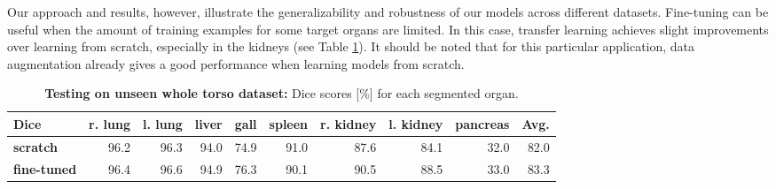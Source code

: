 \documentclass[authoryear]{elsarticle}
\begin{document}
Our approach and results, however, illustrate the generalizability and robustness of our models across different datasets. Fine-tuning can be useful when the amount of training examples for some target organs are limited. In this case, transfer learning achieves slight improvements over learning from scratch, especially in the kidneys (see Table \ref{tab:fine-tuning_dice_results_testing}). It should be noted that for this particular application, data augmentation already gives a good performance when learning models from scratch.
\begin{table}
\footnotesize
\centering
	\caption{\textbf{Testing on unseen whole torso dataset:} Dice scores [\%] for each segmented organ.}
	\label{tab:fine-tuning_dice_results_testing}
	\begin{tabular}{lrrrrrrrrr}
		\hline		
		\rowcolor[gray]{.9}\textbf{Dice} & \textbf{r. lung}	 & \textbf{l. lung}	 & \textbf{liver}	 & \textbf{gall}	 & \textbf{spleen}	 & \textbf{r. kidney}	 & \textbf{l. kidney}	 & \textbf{pancreas}	 & \textbf{Avg.}\tabularnewline
		\hline
		\textbf{scratch}	& 96.2 & 96.3 &	94.0 &	74.9 &	91.0 &	87.6 &	84.1 &	32.0 &	82.0 \tabularnewline
		\rowcolor[gray]{.9}\textbf{fine-tuned}	& 96.4 & 96.6 &	94.9 &	76.3 &	90.1 &	90.5 &	88.5 &	33.0 &	83.3 \tabularnewline
		\hline
	\end{tabular}
\end{table}
\end{document}
